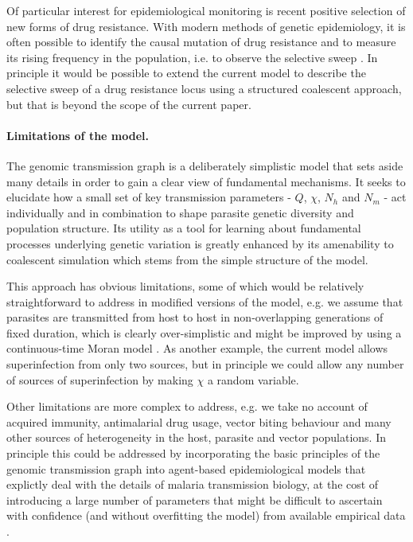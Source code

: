 \documentclass[_main.tex]{subfiles}
\begin{document}
Of particular interest for epidemiological monitoring is recent positive selection of new forms of drug resistance.  With modern methods of genetic epidemiology, it is often possible to identify the causal mutation of drug resistance and to measure its rising frequency in the population, i.e. to observe the selective sweep \cite{Anderson2017,Amato2018}.  In principle it would be possible to extend the current model to describe the selective sweep of a drug resistance locus using a structured coalescent approach, but that is beyond the scope of the current paper.

\paragraph{Limitations of the model.}  The genomic transmission graph is a deliberately simplistic model that sets aside many details in order to gain a clear view of fundamental mechanisms.  It seeks to elucidate how a small set of key transmission parameters - $Q$, $\chi$, $N_h$ and $N_m$ - act individually and in combination to shape parasite genetic diversity and population structure.  Its utility as a tool for learning about fundamental processes underlying genetic variation is greatly enhanced by its amenability to coalescent simulation which stems from the simple structure of the model.

This approach has obvious limitations, some of which would be relatively straightforward to address in modified versions of the model, e.g. we assume that parasites are transmitted from host to host in non-overlapping generations of fixed duration, which is clearly over-simplistic and might be improved by using a continuous-time Moran model \cite{Hendry2021}.  As another example, the current model allows superinfection from only two sources, but in principle we could allow any number of sources of superinfection by making $\chi$ a random variable.

Other limitations are more complex to address, e.g. we take no account of acquired immunity, antimalarial drug usage, vector biting behaviour and many other sources of heterogeneity in the host, parasite and vector populations.   In principle this could be addressed by incorporating the basic principles of the genomic transmission graph into agent-based epidemiological models that explictly deal with the details of malaria transmission biology, at the cost of introducing a large number of parameters that might be difficult to ascertain with confidence (and without overfitting the model) from available empirical data \cite{Eckhoff2012,Daniels2015,Griffin2016,Watson2020}.
\end{document}
